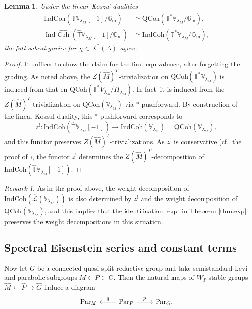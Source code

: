 \documentclass{amsart}
\newtheorem{lemma}[theorem]{Lemma}
\theoremstyle{definition}
\theoremstyle{remark}
\newtheorem{remark}[theorem]{Remark}
\numberwithin{equation}{section}
\DeclareMathOperator{\Ind}{Ind}
\newcommand{\Gm}{{\mathbb{G}_{\mathrm{m}}}}
\newcommand{\wh}{\widehat}
\newcommand{\Par}{\mathrm{Par}}
\newcommand{\IndCoh}{\mathrm{IndCoh}}
\newcommand{\QCoh}{\mathrm{QCoh}}
\newcommand{\Coh}{\mathrm{Coh}}
\newcommand{\V}{\mathbb{V}}
\newcommand{\T}{\mathbb{T}}
\begin{document}
\begin{lemma}
Under the linear Koszul dualities
\begin{align*}
\IndCoh(\widehat{\T}\V_{\lambda_M}[-1]/\Gm) &\simeq \QCoh(\T^* \V_{\lambda_M}/\Gm), \\
\Ind\wh{\Coh}{}^!(\widehat{\T}\V_{\lambda_M}[-1]/\Gm) &\simeq \IndCoh(\T^* \V_{\lambda_M}/\Gm),     
\end{align*}
the full subcategories for $\chi\in X^*(\Delta)$ agree. 
\end{lemma}

\begin{proof}
It suffices to show the claim for the first equivalence, after forgetting the grading. As noted above, the $Z(\wh M)^\Gamma$-trivialization on $\QCoh(\T^* \V_{\lambda_M})$ is induced from that on $\QCoh(\T^* V_{\lambda_M}/H_{\lambda_M})$. In fact, it is induced from the $Z(\wh M)^\Gamma$-trivialization on $\QCoh(\V_{\lambda_M})$ via $*$-pushforward. By construction of the linear Koszul duality, this $*$-pushforward corresponds to 
\[
z^!\colon \IndCoh(\wh{\T}\V_{\lambda_M}[-1])\to \IndCoh(\V_{\lambda_M})=\QCoh(\V_{\lambda_M}), 
\]
and this functor preserves $Z(\wh M)^\Gamma$-trivializations. As $z^!$ is conservative (cf.~the proof of \cite[Theorem 2.1.19]{Chen2023categorical}), the functor $z^!$ determines the $Z(\wh M)^\Gamma$-decomposition of $\IndCoh(\wh{\T}\V_{\lambda_M}[-1])$. 
\end{proof}

\begin{remark}
As in the proof above, the weight decomposition of $\IndCoh(\widehat{\mathcal{L}}(\V_{\lambda_M}))$ is also determined by $z^!$ and the weight decomposition of $\QCoh(\V_{\lambda_M})$, and this implies that the identification $\exp$ in Theorem \ref{thm:exp} preserves the weight decompositions in this situation. 
\end{remark}


\subsection{Spectral Eisenstein series and constant terms}{\label{ss: spectraleisensteinconstantterm}}

Now let $G$ be a connected quasi-split reductive group and take semistandard Levi and parabolic subgroups $M\subset P \subset G$. Then the natural maps of $W_F$-stable groups $\wh{M}\leftarrow \wh{P}\rightarrow \wh{G}$ induce a diagram
\begin{equation*}
    \begin{tikzcd}
        \Par_M & \Par_P \arrow[l, swap,  "q"] \arrow[r, "p"] & \Par_G. 
    \end{tikzcd}
\end{equation*}
\end{document}
